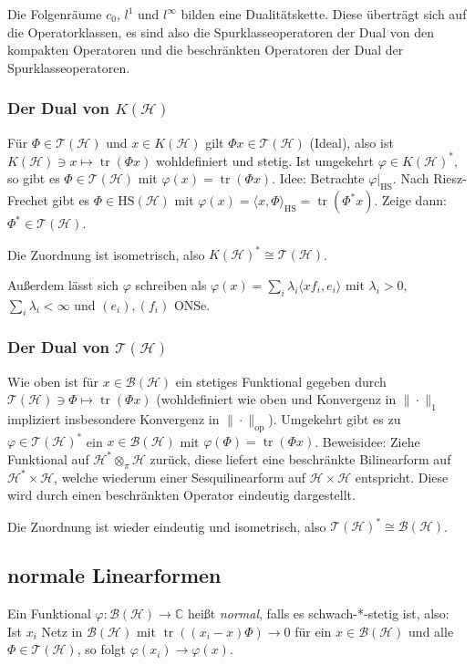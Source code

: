 \documentclass[11pt,a4paper]{scrartcl}
\newcommand{\C}{\mathbb{C}} %
\newcommand{\Hc}{\mathcal{H}}
\newcommand{\B}{\mathcal{B}}
\newcommand{\T}{\mathcal{T}}
\theoremstyle{plain}
\theoremstyle{definition}
\theoremstyle{remark}
\DeclareMathOperator{\tr}{tr}
\begin{document}
Die Folgenräume $c_0$, $l^1$ und $l^\infty$ bilden eine Dualitätskette. Diese überträgt sich auf die Operatorklassen, es sind also die Spurklasseoperatoren der Dual von den kompakten Operatoren und die beschränkten Operatoren der Dual der Spurklasseoperatoren.

\subsubsection{Der Dual von $K(\Hc)$}

Für $\Phi\in \T(\Hc)$ und $x\in K(\Hc)$ gilt $\Phi x\in \T(\Hc)$ (Ideal), also ist $K(\Hc) \ni x\mapsto \tr(\Phi x)$ wohldefiniert und stetig. Ist umgekehrt $\varphi\in K(\Hc)^*$, so gibt es $\Phi\in \T(\Hc)$ mit $\varphi(x)=\tr(\Phi x)$. Idee: Betrachte $\varphi|_\mathrm{HS}$. Nach Riesz-Frechet gibt es $\Phi\in \mathrm{HS}(\Hc)$ mit $\varphi(x)=\langle x, \Phi \rangle_\mathrm{HS} = \tr(\Phi^* x)$. Zeige dann: $\Phi^* \in \T(\Hc)$.

Die Zuordnung ist isometrisch, also $K(\Hc)^*\cong \T(\Hc)$.

Außerdem lässt sich $\varphi$ schreiben als $\varphi(x)=\sum_i \lambda_i \langle x f_i, e_i \rangle$ mit $\lambda_i > 0$, $\sum_i \lambda_i < \infty$ und $(e_i),(f_i)$ ONSe.

\subsubsection{Der Dual von $\T(\Hc)$}

Wie oben ist für $x\in \B(\Hc)$ ein stetiges Funktional gegeben durch $\T(\Hc) \ni \Phi \mapsto \tr(\Phi x)$ (wohldefiniert wie oben und Konvergenz in $\|\cdot\|_1$ impliziert insbesondere Konvergenz in $\|\cdot\|_\mathrm{op}$). Umgekehrt gibt es zu $\varphi\in \T(\Hc)^*$ ein $x\in \B(\Hc)$ mit $\varphi(\Phi)=\tr(\Phi x)$. Beweisidee: Ziehe Funktional auf $\Hc^*\otimes_\pi \Hc$ zurück, diese liefert eine beschränkte Bilinearform auf $\Hc^* \times \Hc$, welche wiederum einer Sesquilinearform auf $\Hc\times \Hc$ entspricht. Diese wird durch einen beschränkten Operator eindeutig dargestellt.

Die Zuordnung ist wieder eindeutig und isometrisch, also $\T(\Hc)^*\cong \B(\Hc)$.

\subsection{normale Linearformen}

Ein Funktional $\varphi: \B(\Hc)\to \C$ heißt \emph{normal}, falls es schwach-*-stetig ist, also: Ist $x_i$ Netz in $\B(\Hc)$ mit $\tr((x_i-x)\Phi)\to 0$ für ein $x\in \B(\Hc)$ und alle $\Phi\in \T(\Hc)$, so folgt $\varphi(x_i)\to\varphi(x)$.
\end{document}
